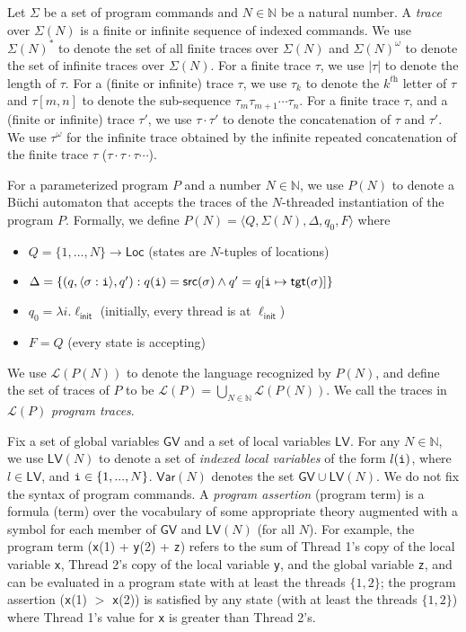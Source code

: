 \documentclass[9pt,nocopyrightspace]{sigplanconf}
\theoremstyle{definition}
\newcommand{\tuple}[1]{\langle #1 \rangle}
\newcommand{\Loc}{\textsf{Loc}}
\newcommand{\idx}[1]{\text{\rm\texttt{#1}}}
\newcommand{\ic}[2]{{\tuple{#1 : #2}}}
\newcommand{\iv}[2]{#1(#2)}
\newcommand{\src}{\textsf{src}}
\newcommand{\tgt}{\textsf{tgt}}
\newcommand{\init}{\textsf{init}}
\newcommand{\lang}{\mathcal{L}}
\newcommand{\GV}{\mathsf{GV}}
\newcommand{\LV}{\mathsf{LV}}
\newcommand{\itrace}{infinite trace}
\newcommand{\natsleq}[1]{\{1,...,#1\}}
\newcommand{\iSigma}[1]{\Sigma(#1)}
\newcommand{\iVar}[1]{\textsf{Var}(#1)}
\newcommand{\iLV}[1]{\LV(#1)}
\begin{document}
Let $\Sigma$ be a set of program commands and $N \in \mathbb{N}$ be a natural
number.  A \emph{trace} over $\iSigma{N}$ is a finite or infinite sequence of
indexed commands.  We use $\iSigma{N}^*$ to denote the set of all finite traces over $\iSigma{N}$ and 
$\iSigma{N}^\omega$ to denote the set of infinite traces over $\iSigma{N}$.  For a finite trace $\tau$, we use $|\tau|$ to denote the length of
$\tau$.  For a (finite or infinite) trace $\tau$, we use 
$\tau_k$ to denote the $k^{\textit{th}}$ letter of $\tau$ and
$\tau[m,n]$ to denote the sub-sequence $\tau_m\tau_{m+1}\dotsi\tau_n$.  For a
finite trace $\tau$, and a (finite or infinite) trace $\tau'$, we use $\tau
\cdot \tau'$ to denote the concatenation of $\tau$ and $\tau'$.
We use
$\tau^\omega$  for the \itrace{} obtained by the infinite repeated
concatenation of the finite trace $\tau$
($\tau\cdot\tau\cdot\tau\dotsi$). 

For a parameterized program $P$ and a number $N \in \mathbb{N}$, we use $P(N)$
to denote a B\"{u}chi automaton that accepts the traces of the $N$-threaded
instantiation of the program $P$.  Formally, we define $P(N) =
\tuple{Q,\iSigma{N},\Delta,q_0,F}$ where
\begin{itemize}
\item $Q = \natsleq{N} \rightarrow \Loc$ (states are $N$-tuples of locations)
\item $\Delta = \{ (q,\ic{\sigma}{\idx{i}},q') : q(\idx{i}) = \src(\sigma) \land q' = q[\idx{i} \mapsto \tgt(\sigma)] \}$
\item $q_0 = \lambda i. \ell_\init$ (initially, every thread is at $\ell_\init$)
\item $F = Q$ (every state is accepting)
\end{itemize}
We use $\lang(P(N))$ to denote the language recognized by $P(N)$, and define
the set of traces of $P$ to be $\lang(P) = \bigcup_{N \in \mathbb{N}}
\lang(P(N))$.  We call the traces in $\lang(P)$ \emph{program traces}.


Fix a set of global variables $\GV$ and a set of local variables $\LV$.  For
any $N \in \mathbb{N}$, we use $\iLV{N}$ to denote a set of \emph{indexed
  local variables} of the form $\iv{l}{\idx{i}}$, where $l \in \LV$, and
$\idx{i} \in \natsleq{N}$.  $\iVar{N}$ denotes the set $\GV \cup \iLV{N}$.  We
do not fix the syntax of program commands.  A \emph{program assertion}
(program term) is a formula (term) over the vocabulary of some appropriate
theory augmented with a symbol for each member of $\GV$ and $\iLV{N}$ (for
all $N$).  For example, the program term (\texttt{x}(1) + \texttt{y}(2) +
\texttt{z}) refers to the sum of Thread 1's copy of the local variable
\texttt{x}, Thread 2's copy of the local variable \texttt{y}, and the global
variable \texttt{z}, and can be evaluated in 
a program state with at least the
threads $\{1,2\}$; the program assertion (\texttt{x}(1) $>$ \texttt{x}(2)) is
satisfied by any state (with at least the threads $\{1,2\}$) where Thread 1's
value for \texttt{x} is greater than Thread 2's.
\end{document}
